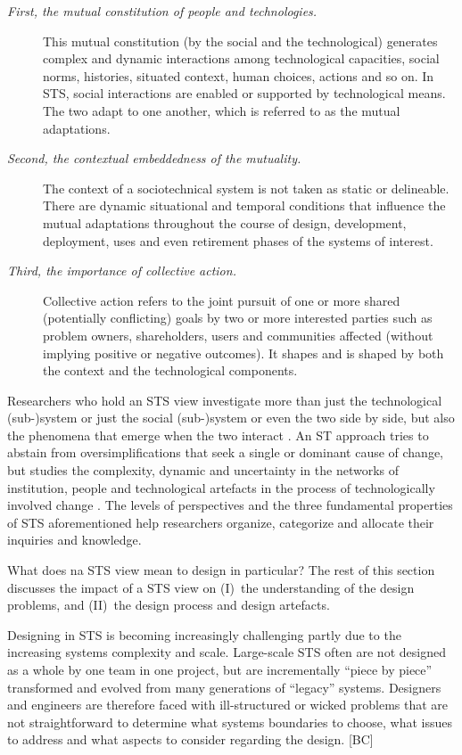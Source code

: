 \begin{description}
\item[\textit{First, the mutual constitution of people and technologies.}] 
This mutual constitution (by the social and the technological) generates complex and dynamic interactions among technological capacities, social norms, histories, situated context, human choices, actions and so on. In STS, social interactions are enabled or supported by technological means. The two adapt to one another, which is referred to as the mutual adaptations. 
%
\item[\textit{Second, the contextual embeddedness of the mutuality.}] 
The context of a sociotechnical system is not taken as static or delineable. There are dynamic situational and temporal conditions that influence 
the mutual adaptations throughout the course of design, development, deployment, uses and even retirement phases of the systems of interest. 
%
\item[\textit{Third, the importance of collective action.}] 
Collective action refers to the joint pursuit of one or more shared (potentially conflicting) goals by two or more interested parties such as problem owners, shareholders, users  and communities affected (without implying positive or negative outcomes). It shapes and is shaped by both the context and the technological components. 
\end{description}
%
%
Researchers who hold an STS view investigate more than just the technological (sub-)system or just the social (sub-)system or even the two side by side, but also the phenomena that emerge when the two interact \cite{Lee2001}. An ST approach tries to abstain from oversimplifications that seek a single or dominant cause of change, but studies the complexity, dynamic and uncertainty in the networks of institution, people and technological artefacts in the process of technologically involved change \cite{Sawyer2014}. 
%
The levels of perspectives and the three fundamental properties of STS aforementioned help researchers organize, categorize and allocate their inquiries and knowledge. 

What does na STS view mean to design in particular? The rest of this section discusses the impact of a STS view on (I)~the understanding of the design problems, and (II)~the design process and design artefacts.

 Designing in STS is becoming increasingly challenging partly due to the increasing systems complexity and scale.  
Large-scale STS often are not designed as a whole by one team in one project, but are incrementally ``piece by piece'' transformed and evolved from many generations of ``legacy'' systems. Designers and engineers are therefore faced with ill-structured or wicked problems that are not straightforward to determine what systems boundaries to choose, what issues to address and what aspects to consider regarding the design. [BC]

